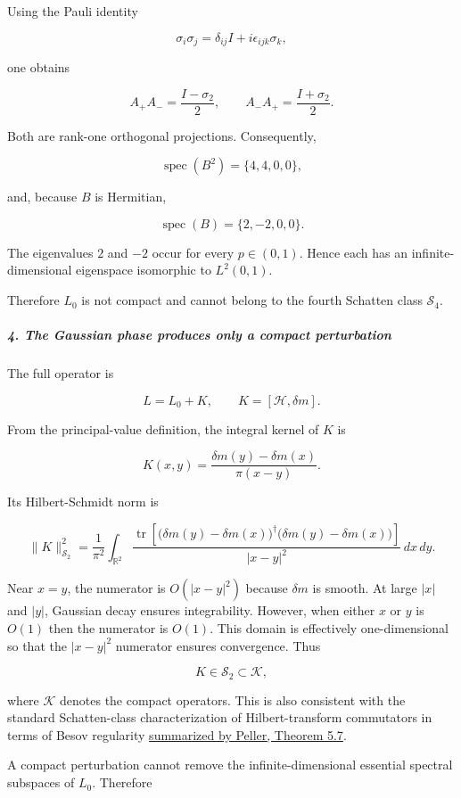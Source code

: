 Using the Pauli identity

\[
\sigma_i\sigma_j=\delta_{ij}I+i\epsilon_{ijk}\sigma_k,
\]

one obtains

\[
A_+A_-=\frac{I-\sigma_2}{2}, \qquad A_-A_+=\frac{I+\sigma_2}{2}.
\]

Both are rank-one orthogonal projections. Consequently,

\[
\operatorname{spec}(B^2)=\{4,4,0,0\},
\]

and, because $B$ is Hermitian,

\[
\operatorname{spec}(B)=\{2,-2,0,0\}.
\]

The eigenvalues $2$ and $-2$ occur for every $p\in(0,1)$. Hence each has an infinite-dimensional eigenspace isomorphic to $L^2(0,1)$.

Therefore $L_0$ is not compact and cannot belong to the fourth Schatten class $\mathcal S_4$.

\subparagraph*{4. The Gaussian phase produces only a compact perturbation}

The full operator is

\[
L=L_0+K, \qquad K=[\mathcal H,\delta m].
\]

From the principal-value definition, the integral kernel of $K$ is

\[
K(x,y) = \frac{\delta m(y)-\delta m(x)} {\pi(x-y)}.
\]

Its Hilbert-Schmidt norm is

\[
\|K\|_{\mathcal S_2}^2 = \frac{1}{\pi^2} \int_{\mathbb R^2} \frac{ \operatorname{tr}\!\left[ \bigl(\delta m(y)-\delta m(x)\bigr)^\dagger \bigl(\delta m(y)-\delta m(x)\bigr) \right] } {|x-y|^2}\,dx\,dy.
\]

Near $x=y$, the numerator is $O(|x-y|^2)$ because $\delta m$ is smooth. At large $|x|$ and $|y|$, Gaussian decay ensures integrability. However, when either $x$ or $y$ is $O(1)$ then the numerator is $O(1)$. This domain is effectively one-dimensional so that the $|x-y|^2$ numerator ensures convergence. Thus

\[
K\in\mathcal S_2\subset\mathcal K,
\]

where $\mathcal K$ denotes the compact operators. This is also consistent with the standard Schatten-class characterization of Hilbert-transform commutators in terms of Besov regularity \href{\detokenize{https://www.mathnet.ru/eng/rm10140}}{summarized by Peller, Theorem 5.7}.

A compact perturbation cannot remove the infinite-dimensional essential spectral subspaces of $L_0$. Therefore

